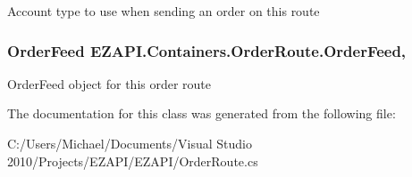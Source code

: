 Account type to use when sending an order on this route 

\hypertarget{class_e_z_a_p_i_1_1_containers_1_1_order_route_ae275833d711d3350f1793316e37c2a22}{
\subsubsection[{Order\-Feed}]{\setlength{\rightskip}{0pt plus 5cm}Order\-Feed E\-Z\-A\-P\-I.\-Containers.\-Order\-Route.\-Order\-Feed\hspace{0.3cm}{\ttfamily [get]}, {\ttfamily [set]}}}\label{class_e_z_a_p_i_1_1_containers_1_1_order_route_ae275833d711d3350f1793316e37c2a22}


Order\-Feed object for this order route 



The documentation for this class was generated from the following file\-:\begin{DoxyCompactItemize}
\item 
C\-:/\-Users/\-Michael/\-Documents/\-Visual Studio 2010/\-Projects/\-E\-Z\-A\-P\-I/\-E\-Z\-A\-P\-I/Order\-Route.\-cs\end{DoxyCompactItemize}
